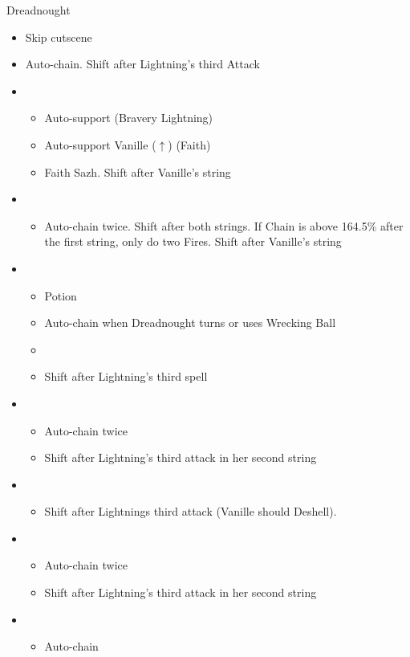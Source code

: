 \begin{battle}{Dreadnought}
\begin{multicols}{2}
\begin{itemize}
\begin{itemize}
    \end{itemize}
    \item Skip cutscene
    \columnbreak
    \item Auto-chain. Shift after Lightning’s third Attack
    \item \sixth
    \begin{itemize}
        \item Auto-support (Bravery Lightning)
        \item Auto-support Vanille ($\uparrow$) (Faith)
        \item Faith Sazh. Shift after Vanille's string
    \end{itemize}
    \item \fifth
    \begin{itemize}
        \item Auto-chain twice. Shift after both strings. If Chain is above 164.5\% after the first string, only do two Fires. Shift after Vanille's string
    \end{itemize}
    \item \fourth
    \begin{itemize}
        \item Potion
        \item Auto-chain when Dreadnought turns or uses Wrecking Ball
        \item \stagger
        \item Shift after Lightning's third spell
    \end{itemize}
    \item \first
    \begin{itemize}
        \item Auto-chain twice
        \item Shift after Lightning's third attack in her second string
    \end{itemize}
    \item \second
    \begin{itemize}
        \item Shift after Lightnings third attack (Vanille should Deshell).
    \end{itemize}
    \item \first
    \begin{itemize}
        \item Auto-chain twice
        \item Shift after Lightning's third attack in her second string
    \end{itemize}
    \item \third
    \begin{itemize}
        \item Auto-chain
    \end{itemize}
\end{itemize}
\end{multicols}
\end{battle}
